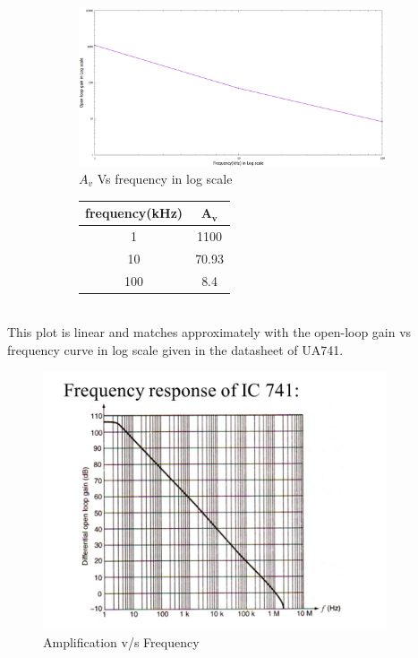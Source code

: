 \documentclass[12pt]{article}
\begin{document}
        \begin{figure}[H]
        
            \begin{subfigure}{0.75\linewidth}
                \centering
                \includegraphics[width = \linewidth]{aLAB-2-1.png}
                \caption{$A_v$ Vs frequency in log scale}
            \end{subfigure}
            \begin{subfigure}{0.1\linewidth}
                \centering
                \begin{tabular}{|c|c|}
                   \hline
                     \bfseries frequency(kHz) & $\mathbf{A_v}$ \\ \hline
                     1  & 1100 \\ \hline
                     10  & 70.93 \\ \hline
                     100  & 8.4 \\ \hline
                \end{tabular}
            \end{subfigure}
        \end{figure}
        
\\
     This plot is linear and matches approximately with the open-loop gain vs frequency curve in log scale given in the datasheet of UA741.
        \begin{figure}[H]
            \centering
            \includegraphics[width = 0.8\linewidth, height = 3in]{slide_14.jpg}
            \caption{Amplification v/s Frequency}
        \end{figure}
\end{document}
